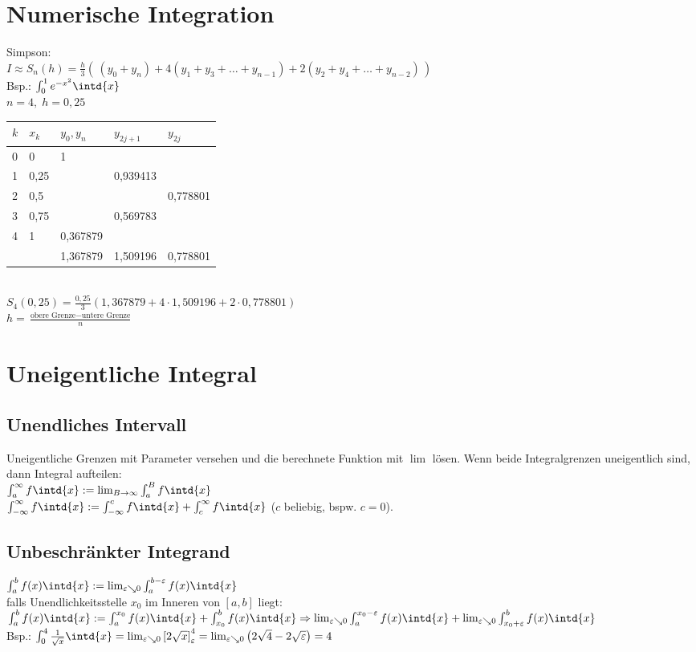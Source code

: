 \documentclass{scrreprt}
\begin{document}
\section{Numerische Integration}
Simpson:\\
$I \approx S_n(h)=\frac{h}{3}\left(\,(y_0+y_n)+4(y_1+y_3+\dots+y_{n-1})+2(y_2+y_4+\dots+y_{n-2})\,\right)$\\
Bsp.: $\int_0^1 e^{-x^2}\intd{x}$\\
$n=4, \; h=0,25$\\
\begin{tabular}{l l l l l}
$k$ & $x_k$ & $y_0, y_n$ & $y_{2j+1}$ & $y_{2j}$\\
\hline
0 & 0		& 1	&\\
1 & 0,25& 	&0,939413\\
2 & 0,5	&		&					& 0,778801\\
3 & 0,75&		&0,569783\\
4 & 1		& 0,367879\\
\hline 
 & &		1,367879 & 1,509196 & 0,778801
\end{tabular}\\
$S_4(0,25)=\frac{0,25}{3}\left(1,367879 + 4\cdot 1,509196 + 2\cdot 0,778801\right)$\\
$h=\frac{\text{obere Grenze}-\text{untere Grenze}}{n}$

\section{Uneigentliche Integral}
\subsection{Unendliches Intervall}
Uneigentliche Grenzen mit Parameter versehen und die berechnete Funktion mit $\lim$ lösen. Wenn beide Integralgrenzen uneigentlich sind, dann Integral aufteilen:\\
$\int_a^{\infty} f \intd{x} := \lim_{B \to \infty} \int_a^{B} f \intd{x}$\\
$\int_{-\infty}^{\infty} f \intd{x} := \int_{-\infty}^c f \intd{x} + \int_c^{\infty} f \intd{x}$ ($c$ beliebig, bspw. $c=0$).
\subsection{Unbeschränkter Integrand}
$\int_a^b f(x) \intd{x} := \lim_{\varepsilon \searrow 0} \int_a^{b-\varepsilon} f(x) \intd{x}$\\
falls Unendlichkeitsstelle $x_0$ im Inneren von $[a,b]$ liegt:\\
$\int_a^b f(x) \intd{x} := \int_a^{x_0} f(x) \intd{x} + \int_{x_0}^b f(x) \intd{x} \Rightarrow \lim_{\varepsilon\searrow 0} \int_a^{x_0-\varepsilon} f(x) \intd{x} + \lim_{\varepsilon\searrow 0} \int_{x_0 + \varepsilon}^b f(x) \intd{x}$\\
Bsp.: $\int_0^4 \frac{1}{\sqrt{x}}\intd{x} = \lim_{\varepsilon\searrow0} \left[2\sqrt{x}\right]_{\varepsilon}^4 = \lim_{\varepsilon \searrow 0} \left( 2 \sqrt{4}-2 \sqrt{\varepsilon}\right) = 4$
\end{document}
